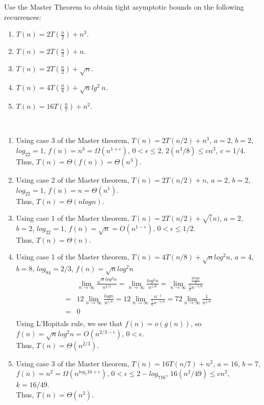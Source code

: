 \documentclass{assignment}
\begin{document}
\begin{problemlist}
\clearpage
\pbitem
\begin{problem}
Use the Master Theorem to obtain tight asymptotic bounds on the following recurrences:
\begin{enumerate}
\item $T(n)=2T(\frac{n}{2})+n^3$.
\item $T(n)=2T(\frac{n}{2})+n$.
\item $T(n)=2T(\frac{n}{2})+\sqrt{n}$.
\item $T(n)=4T(\frac{n}{8})+\sqrt{n}lg^2~n$.
\item $T(n)=16T(\frac{n}{7})+n^2$.
\end{enumerate}
\end{problem}
\begin{answer}
\\
\begin{enumerate}
\item
Using case 3 of the Master theorem, $T(n)=2T(n/2)+n^3$, $a=2$, $b=2$, $log_22=1$, $f(n)=n^3=\Omega (n^{1+\epsilon})$, $0< \epsilon \le 2$, $2(n^3/8)\le cn^3$, $c=1/4$.\\
Thus, $T(n) = \Theta(f(n)) = \Theta(n^3)$.\\ 
\item
Using case 2 of the Master theorem, $T(n)=2T(n/2)+n$, $a=2$, $b=2$, $log_22=1$, $f(n)=n=\Theta (n^1)$.\\
Thus, $T(n) = \Theta(nlogn)$.\\
\item
Using case 1 of the Master theorem, $T(n)=2T(n/2)+\sqrt(n)$, $a=2$, $b=2$, $log_22=1$, $f(n)=\sqrt{n}=O(n^{1-\epsilon})$, $0<\epsilon \le 1/2$.\\
Thus, $T(n)=\Theta(n)$.\\
\item
Using case 1 of the Master theorem, $T(n)=4T(n/8)+\sqrt{n}log^2n$, $a=4$, $b=8$, $log_84=2/3$, $f(n)=\sqrt{n}log^2n$\\
\begin{align*}
&\lim_{n\rightarrow \infty}\frac{\sqrt{n}log^2n}{n^{2/3}}=\lim_{n\rightarrow \infty}\frac{log^2n}{n^{1/6}}=\lim_{n\rightarrow \infty}\frac{\frac{2logn}{n}}{\frac{1}{6}n^{-5/6}}\\
=&12\lim_{n\rightarrow \infty}\frac{logn}{n^{1/6}}=12\lim_{n\rightarrow \infty}\frac{n^{-1}}{\frac{1}{6}n^{-5/6}}=72\lim_{n\rightarrow \infty}\frac{1}{n^{1/6}}\\
=&0\\
\end{align*}
Using L'Hopitals rule, we see that $f(n)=o(g(n))$, so $f(n)=\sqrt{n}log^2n=O(n^{2/3-\epsilon})$, $0<\epsilon$.\\
Thus, $T(n)=\Theta (n^{2/3})$.\\
\item
Using case 3 of the Master theorem, $T(n)=16T(n/7)+n^2$, $a=16$, $b=7$, $f(n)=n^2=\Omega (n^{log_7 16 + \epsilon})$, $0<\epsilon \le 2-log_716$, $16(n^2/49)\le cn^2$, $k=16/49$.\\
Thus, $T(n)=\Theta (n^2)$.\\
\end{enumerate}
\end{answer}


\end{problemlist}
\end{document}
